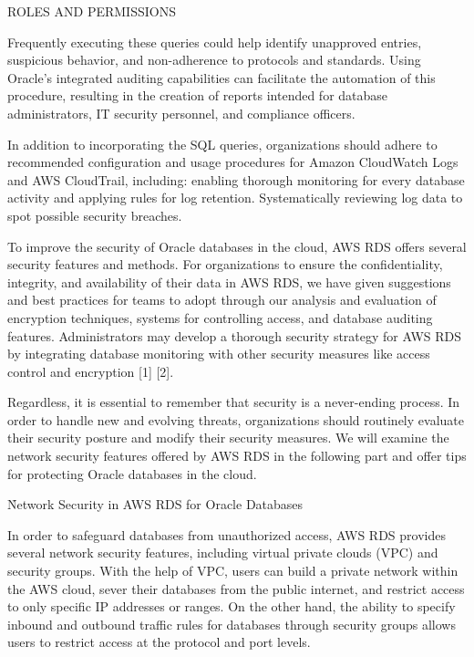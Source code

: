 \documentclass{ieee}
\begin{document}
    {ROLES AND PERMISSIONS}


Frequently executing these queries could help identify unapproved entries, suspicious behavior, and non-adherence to protocols and standards. Using Oracle's integrated auditing capabilities can facilitate the automation of this procedure, resulting in the creation of reports intended for database administrators, IT security personnel, and compliance officers.

In addition to incorporating the SQL queries, organizations should adhere to recommended configuration and usage procedures for Amazon CloudWatch Logs and AWS CloudTrail, including: enabling thorough monitoring for every database activity and applying rules for log retention. Systematically reviewing log data to spot possible security breaches.

To improve the security of Oracle databases in the cloud, AWS RDS offers several security features and methods. For organizations to ensure the confidentiality, integrity, and availability of their data in AWS RDS, we have given suggestions and best practices for teams to adopt through our analysis and evaluation of encryption techniques, systems for controlling access, and database auditing features. Administrators may develop a thorough security strategy for AWS RDS by integrating database monitoring with other security measures like access control and encryption [1] [2].

Regardless, it is essential to remember that security is a never-ending process. In order to handle new and evolving threats, organizations should routinely evaluate their security posture and modify their security measures. We will examine the network security features offered by AWS RDS in the following part and offer tips for protecting Oracle databases in the cloud.

\h{Network Security in AWS RDS for Oracle Databases}

In order to safeguard databases from unauthorized access, AWS RDS provides several network security features, including virtual private clouds (VPC) and security groups. With the help of VPC, users can build a private network within the AWS cloud, sever their databases from the public internet, and restrict access to only specific IP addresses or ranges. On the other hand, the ability to specify inbound and outbound traffic rules for databases through security groups allows users to restrict access at the protocol and port levels.
\end{document}

